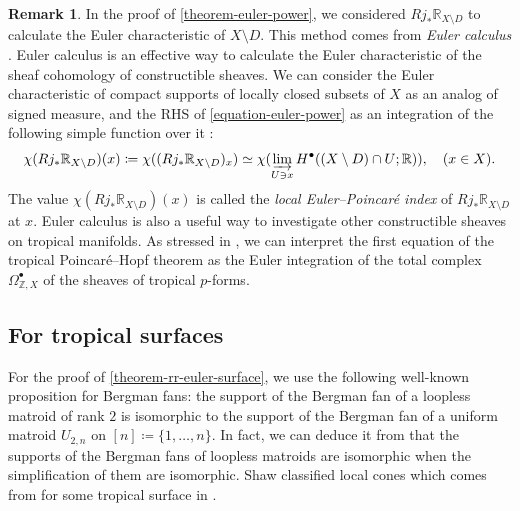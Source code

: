 \documentclass[a4paper,dvipdfmx,reqno,12pt]{amsart}
\theoremstyle{definition}
\newtheorem{remark}[theorem]{Remark}
\newcommand{\deq}{\coloneqq}
\numberwithin{equation}{section}
\begin{document}
\begin{remark}
In the proof of \cref{theorem-euler-power},
we considered $Rj_*\mathbb{R}_{X\setminus D}$ to calculate
the Euler characteristic of $X\setminus D$.
This method comes from \emph{Euler calculus}
\cite{MR970076,MR1115569}.
Euler calculus is an effective way to calculate
the Euler characteristic of the sheaf cohomology of
constructible sheaves. We can consider 
the Euler characteristic of compact supports of 
locally closed subsets of $X$
as an analog of signed measure,
and the RHS of \cref{equation-euler-power} as an
integration of the following simple function over it
\cite[(3.4)]{MR1115569}:
\begin{align}
\chi(Rj_*\mathbb{R}_{X\setminus D})(x)\deq 
\chi((Rj_*\mathbb{R}_{X\setminus D})_x) 
\simeq \chi(\varinjlim_{U\ni x} H^{\bullet}((X\setminus D)
\cap U;\mathbb{R})), \quad (x\in X).
\end{align}
The value $\chi(Rj_*\mathbb{R}_{X\setminus D})(x)$ is
called the \emph{local Euler--Poincar\'e index} of 
$Rj_*\mathbb{R}_{X\setminus D}$ at $x$.
Euler calculus is also a useful way to
investigate other constructible sheaves
on tropical manifolds.
As stressed in \cite[Remark 4.8]{MR4540954},
we can interpret the first equation of 
the tropical Poincar\'e--Hopf theorem
\cite[Theorem 4.7]{MR4540954} as 
the Euler integration of the total complex
$\Omega^{\bullet}_{\mathbb{Z},X}$ of the sheaves of
tropical $p$-forms.
\end{remark}

\subsection{For tropical surfaces}

For the proof of \cref{theorem-rr-euler-surface}, we 
use the following well-known 
proposition for Bergman fans: 
the support of the Bergman fan of
a loopless matroid of rank $2$ 
is isomorphic to the support of the Bergman fan of
a uniform matroid $U_{2,n}$ on
$[n]\deq \{1,\ldots,n\}$.
In fact, we can deduce it from that 
the supports of the Bergman fans of
loopless matroids are isomorphic
when the simplification of them are isomorphic.
Shaw classified local cones which comes from
for some tropical surface in
\cite[Corollary 2.4]{shaw2015tropical}.
\end{document}
